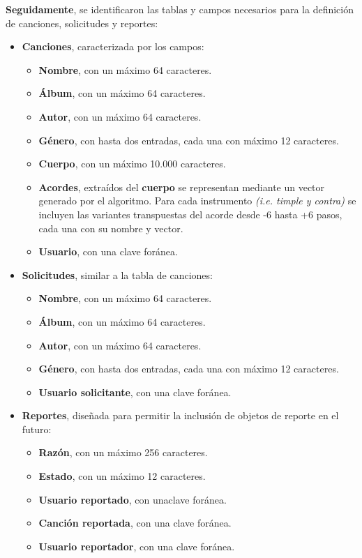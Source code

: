 \textbf{Seguidamente}, se identificaron las tablas y campos necesarios para la definición de canciones, solicitudes y reportes:

\begin{itemize}
    \item \textbf{Canciones}, caracterizada por los campos:
    \begin{itemize}
        \item \textbf{Nombre}, con un máximo 64 caracteres.
        \item \textbf{Álbum}, con un máximo 64 caracteres.
        \item \textbf{Autor}, con un máximo 64 caracteres.
        \item \textbf{Género}, con hasta dos entradas, cada una con máximo 12 caracteres.
        \item \textbf{Cuerpo}, con un máximo 10.000 caracteres.
        \item \textbf{Acordes}, extraídos del \textbf{cuerpo} se representan mediante un vector generado por el algoritmo. Para cada instrumento \textit{(i.e. timple y contra)} se incluyen las variantes transpuestas del acorde desde -6 hasta +6 pasos, cada una con su nombre y vector.
        \item \textbf{Usuario}, con una clave foránea.
    \end{itemize}
    \item \textbf{Solicitudes}, similar a la tabla de canciones:
    \begin{itemize}
        \item \textbf{Nombre}, con un máximo 64 caracteres.
        \item \textbf{Álbum}, con un máximo 64 caracteres.
        \item \textbf{Autor}, con un máximo 64 caracteres.
        \item \textbf{Género}, con hasta dos entradas, cada una con máximo 12 caracteres.
        \item \textbf{Usuario solicitante}, con una clave foránea.
    \end{itemize}
    \item \textbf{Reportes}, diseñada para permitir la inclusión de objetos de reporte en el futuro:
    \begin{itemize}
        \item \textbf{Razón}, con un máximo 256 caracteres.
        \item \textbf{Estado}, con un máximo 12 caracteres.
        \item \textbf{Usuario reportado}, con unaclave foránea.
        \item \textbf{Canción reportada}, con una clave foránea.
        \item \textbf{Usuario reportador}, con una clave foránea.
    \end{itemize}
\end{itemize}

